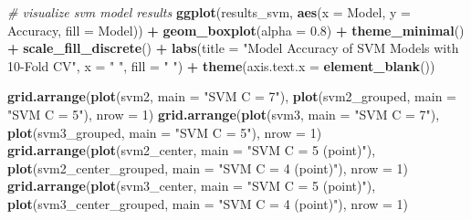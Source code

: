 \documentclass[12pt,twoside]{reedthesis}
\newenvironment{Shaded}{\begin{snugshade}}{\end{snugshade}}
\newcommand{\CommentTok}[1]{\textcolor[rgb]{0.56,0.35,0.01}{\textit{#1}}}
\newcommand{\DataTypeTok}[1]{\textcolor[rgb]{0.13,0.29,0.53}{#1}}
\newcommand{\DecValTok}[1]{\textcolor[rgb]{0.00,0.00,0.81}{#1}}
\newcommand{\FloatTok}[1]{\textcolor[rgb]{0.00,0.00,0.81}{#1}}
\newcommand{\KeywordTok}[1]{\textcolor[rgb]{0.13,0.29,0.53}{\textbf{#1}}}
\newcommand{\NormalTok}[1]{#1}
\newcommand{\OperatorTok}[1]{\textcolor[rgb]{0.81,0.36,0.00}{\textbf{#1}}}
\newcommand{\StringTok}[1]{\textcolor[rgb]{0.31,0.60,0.02}{#1}}
\begin{document}
\begin{Shaded}
\begin{Highlighting}[]
{{{\CommentTok{# visualize svm model results}
\KeywordTok{ggplot}\NormalTok{(results_svm, }\KeywordTok{aes}\NormalTok{(}\DataTypeTok{x =}\NormalTok{ Model, }\DataTypeTok{y =}\NormalTok{ Accuracy, }\DataTypeTok{fill =}\NormalTok{ Model)) }\OperatorTok{+}
\StringTok{  }\KeywordTok{geom_boxplot}\NormalTok{(}\DataTypeTok{alpha =} \FloatTok{0.8}\NormalTok{) }\OperatorTok{+}
\StringTok{  }\KeywordTok{theme_minimal}\NormalTok{() }\OperatorTok{+}\StringTok{ }
\StringTok{  }\KeywordTok{scale_fill_discrete}\NormalTok{() }\OperatorTok{+}
\StringTok{  }\KeywordTok{labs}\NormalTok{(}\DataTypeTok{title =} \StringTok{"Model Accuracy of SVM Models with 10-Fold CV"}\NormalTok{, }\DataTypeTok{x =} \StringTok{" "}\NormalTok{, }\DataTypeTok{fill =} \StringTok{" "}\NormalTok{) }\OperatorTok{+}\StringTok{ }
\StringTok{  }\KeywordTok{theme}\NormalTok{(}\DataTypeTok{axis.text.x =} \KeywordTok{element_blank}\NormalTok{())}

\KeywordTok{grid.arrange}\NormalTok{(}\KeywordTok{plot}\NormalTok{(svm2, }\DataTypeTok{main =} \StringTok{"SVM C = 7"}\NormalTok{),}
             \KeywordTok{plot}\NormalTok{(svm2_grouped, }\DataTypeTok{main =} \StringTok{"SVM C = 5"}\NormalTok{), }\DataTypeTok{nrow =} \DecValTok{1}\NormalTok{)}
\KeywordTok{grid.arrange}\NormalTok{(}\KeywordTok{plot}\NormalTok{(svm3, }\DataTypeTok{main =} \StringTok{"SVM C = 7"}\NormalTok{),}
             \KeywordTok{plot}\NormalTok{(svm3_grouped, }\DataTypeTok{main =} \StringTok{"SVM C = 5"}\NormalTok{), }\DataTypeTok{nrow =} \DecValTok{1}\NormalTok{)}
\KeywordTok{grid.arrange}\NormalTok{(}\KeywordTok{plot}\NormalTok{(svm2_center, }\DataTypeTok{main =} \StringTok{"SVM C = 5 (point)"}\NormalTok{),}
             \KeywordTok{plot}\NormalTok{(svm2_center_grouped, }\DataTypeTok{main =} \StringTok{"SVM C = 4 (point)"}\NormalTok{), }\DataTypeTok{nrow =} \DecValTok{1}\NormalTok{)}
\KeywordTok{grid.arrange}\NormalTok{(}\KeywordTok{plot}\NormalTok{(svm3_center, }\DataTypeTok{main =} \StringTok{"SVM C = 5 (point)"}\NormalTok{),}
             \KeywordTok{plot}\NormalTok{(svm3_center_grouped, }\DataTypeTok{main =} \StringTok{"SVM C = 4 (point)"}\NormalTok{), }\DataTypeTok{nrow =} \DecValTok{1}\NormalTok{)}

}}}
\end{Highlighting}
\end{Shaded}
\end{document}
